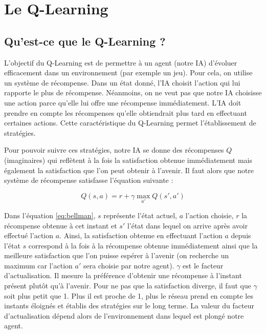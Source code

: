 \section{Le Q-Learning}

\subsection{Qu'est-ce que le Q-Learning ?}

L'objectif du Q-Learning est de permettre à un agent (notre IA) d'évoluer efficacement dans un environnement (par exemple un jeu). Pour cela, on utilise un système de
récompense. Dans un état donné, l'IA choisit l'action qui lui rapporte le plus de récompense. Néanmoins, on ne veut pas que notre IA choisisse une action parce qu'elle
lui offre une récompense immédiatement. L'IA doit prendre en compte les récompenses qu'elle obtiendrait plus tard en effectuant certaines actions. Cette 
caractéristique du Q-Learning permet l'établissement de stratégies.

Pour pouvoir suivre ces stratégies, notre IA se donne des récompenses $Q$ (imaginaires) qui reflètent à la fois la satisfaction obtenue immédiatement mais également
la satisfaction que l'on peut obtenir à l'avenir. Il faut alors que notre système de récompense satisfasse l'équation suivante : 

\begin{equation}
 Q\left(s,a\right) = r + \gamma \max_{a'} Q\left(s',a'\right)
 \label{eq:bellman}
\end{equation}

Dans l'équation \ref{eq:bellman}, $s$ représente l'état actuel, $a$ l'action choisie, $r$ la récompense obtenue à cet instant et $s'$ l'état dans lequel on arrive
après avoir effectué l'action $a$. Ainsi, la satisfaction obtenue en effectuant l'action $a$ depuis l'état $s$ correspond à la fois à la récompense obtenue immédiatement
ainsi que la meilleure satisfaction que l'on puisse espérer à l'avenir (on recherche un maximum car l'action $a'$ sera choisie par notre agent). $\gamma$ est le facteur
d'actualisation. Il mesure la préférence d'obtenir une récompense à l'instant présent plutôt qu'à l'avenir. Pour ne pas que la satisfaction diverge, il faut que $\gamma$
soit plus petit que 1. Plus il est proche de 1, plus le réseau prend en compte les instants éloignés et établis des stratégies sur le long terme. La valeur du facteur
d'actualisation dépend alors de l'environnement dans lequel est plongé notre agent.

